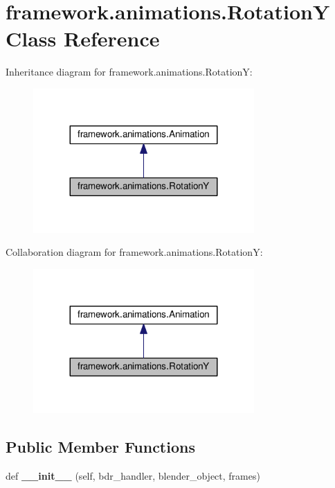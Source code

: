 \hypertarget{classframework_1_1animations_1_1RotationY}{}\section{framework.\+animations.\+RotationY Class Reference}
\label{classframework_1_1animations_1_1RotationY}


Inheritance diagram for framework.\+animations.\+RotationY\+:
\nopagebreak
\begin{figure}[H]
\begin{center}
\leavevmode
\includegraphics[width=239pt]{classframework_1_1animations_1_1RotationY__inherit__graph}
\end{center}
\end{figure}


Collaboration diagram for framework.\+animations.\+RotationY\+:
\nopagebreak
\begin{figure}[H]
\begin{center}
\leavevmode
\includegraphics[width=239pt]{classframework_1_1animations_1_1RotationY__coll__graph}
\end{center}
\end{figure}
\subsection*{Public Member Functions}
\begin{DoxyCompactItemize}
\item 
def {\bfseries \+\_\+\+\_\+init\+\_\+\+\_\+} (self, bdr\+\_\+handler, blender\+\_\+object, frames)\hypertarget{classframework_1_1animations_1_1RotationY_acc35ac30c5b05ed6b40921ef5faba1a5}{}\label{classframework_1_1animations_1_1RotationY_acc35ac30c5b05ed6b40921ef5faba1a5}

\end{DoxyCompactItemize}
